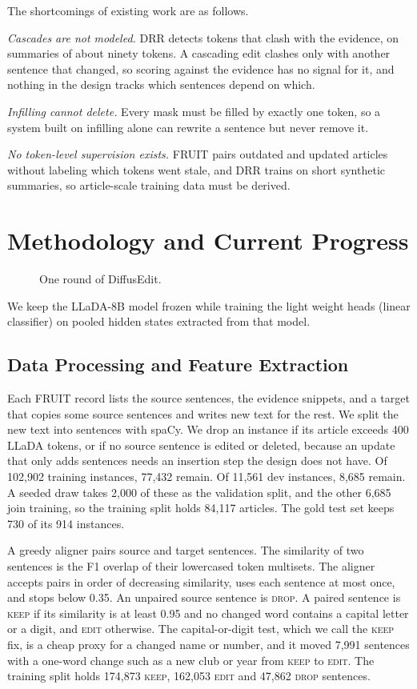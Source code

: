 \documentclass[11pt]{article}
\newcommand{\keep}{\textsc{keep}}
\newcommand{\edit}{\textsc{edit}}
\newcommand{\drop}{\textsc{drop}}
\begin{document}
The shortcomings of existing work are as follows.

    \emph{Cascades are not modeled.} DRR detects tokens that clash with the evidence, on summaries of about ninety tokens. A cascading edit clashes only with another sentence that changed, so scoring against the evidence has no signal for it, and nothing in the design tracks which sentences depend on which.
    
    \emph{Infilling cannot delete.} Every mask must be filled by exactly one token, so a system built on infilling alone can rewrite a sentence but never remove it.
    
    \emph{No token-level supervision exists.} FRUIT pairs outdated and updated articles without labeling which tokens went stale, and DRR trains on short synthetic summaries, so article-scale training data must be derived.
   
\section{Methodology and Current Progress}
    \begin{figure}[t]
    \centering
    
    \caption{One round of DiffusEdit.}
    \label{fig:pipeline}
    \end{figure}
\label{sec:progress}
    We keep the LLaDA-8B model frozen while training the light weight heads (linear classifier) on pooled hidden states extracted from that model.
    \subsection{Data Processing and Feature Extraction}
    \label{subsec:data}
    Each FRUIT record lists the source sentences, the evidence snippets, and a target that copies some source sentences and writes new text for the rest. We split the new text into sentences with spaCy. We drop an instance if its article exceeds 400 LLaDA tokens, or if no source sentence is edited or deleted, because an update that only adds sentences needs an insertion step the design does not have. Of 102,902 training instances, 77,432 remain. Of 11,561 dev instances, 8,685 remain. A seeded draw takes 2,000 of these as the validation split, and the other 6,685 join training, so the training split holds 84,117 articles. The gold test set keeps 730 of its 914 instances.

    A greedy aligner pairs source and target sentences. The similarity of two sentences is the F1 overlap of their lowercased token multisets. The aligner accepts pairs in order of decreasing similarity, uses each sentence at most once, and stops below 0.35. An unpaired source sentence is \drop{}. A paired sentence is \keep{} if its similarity is at least 0.95 and no changed word contains a capital letter or a digit, and \edit{} otherwise. The capital-or-digit test, which we call the \keep{} fix, is a cheap proxy for a changed name or number, and it moved 7,991 sentences with a one-word change such as a new club or year from \keep{} to \edit{}. The training split holds 174,873 \keep{}, 162,053 \edit{} and 47,862 \drop{} sentences.
\end{document}
